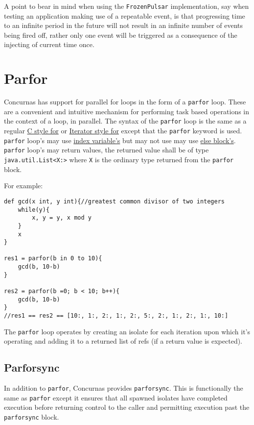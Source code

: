 \documentclass[conc-doc]{subfiles}
\begin{document}
A point to bear in mind when using the \lstinline{FrozenPulsar} implementation, say when testing an application making use of a repeatable event, is that progressing time to an infinite period in the future will not result in an infinite number of events being fired off, rather only one event will be triggered as a consequence of the injecting of current time once.





\section{Parfor}
Concurnas has support for parallel for loops in the form of a \lstinline{parfor} loop. These are a convenient and intuitive mechanism for performing task based operations in the context of a loop, in parallel. The syntax of the \lstinline{parfor} loop is the same as a regular \hyperref[subsec:cstylefor]{C style for} or \hyperref[subsec:IteratorStyleFor]{Iterator style for} except that the \lstinline{parfor} keyword is used. \lstinline{parfor} loop's may use \hyperref[subsec:indexVar]{index variable's} but may not use may use \hyperref[subsec:forelseblock]{else block's}. \lstinline{parfor} loop's may return values, the returned value shall be of type \lstinline{java.util.List<X:>} where \lstinline{X} is the ordinary type returned from the \lstinline{parfor} block.

For example:

\begin{lstlisting}
def gcd(x int, y int){//greatest common divisor of two integers
	while(y){
		x, y = y, x mod y
	}
	x
}

res1 = parfor(b in 0 to 10){
	gcd(b, 10-b)
}

res2 = parfor(b =0; b < 10; b++){
	gcd(b, 10-b)
}
//res1 == res2 == [10:, 1:, 2:, 1:, 2:, 5:, 2:, 1:, 2:, 1:, 10:]
\end{lstlisting}

The \lstinline{parfor} loop operates by creating an isolate for each iteration upon which it's operating and adding it to a returned list of refs (if a return value is expected).

\subsection{Parforsync}
In addition to \lstinline{parfor}, Concurnas provides \lstinline{parforsync}. This is functionally the same as \lstinline{parfor} except it ensures that all spawned isolates have completed execution before returning control to the caller and permitting execution past the \lstinline{parforsync} block.
\end{document}
